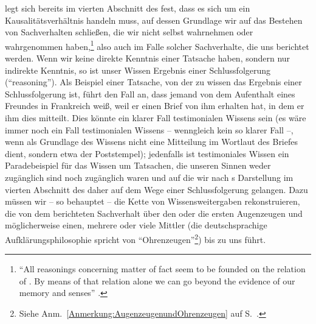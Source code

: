  legt sich bereits im vierten Abschnitt des  fest, dass es sich um ein Kausalitätsverhältnis
handeln muss, auf dessen Grundlage wir auf das Bestehen von Sachverhalten
schließen, die wir nicht selbst wahrnehmen oder wahrgenommen
haben,\footnote{\enquote{All reasonings concerning matter of fact seem to be
founded on the relation of . By means of that relation
alone we can go beyond the evidence of our memory and senses}
\parencite[][24]{Hume:AnEnquiryConcerningHumanUnderstanding1964}.} also auch im
Falle solcher Sachverhalte, die uns berichtet werden. Wenn wir keine direkte
Kenntnis einer Tatsache haben, sondern nur indirekte Kenntnis, so ist unser
Wissen Ergebnis einer Schlussfolgerung (\enquote{reasoning}). Als Beispiel einer
Tatsache, von der zu wissen das Ergebnis einer Schlussfolgerung ist, führt
 den Fall an, dass jemand von dem Aufenthalt eines Freundes in
Frankreich weiß, weil er einen Brief von ihm erhalten hat, in dem er ihm dies
mitteilt. Dies könnte ein klarer Fall testimonialen Wissens sein (es wäre immer
noch ein Fall testimonialen Wissens -- wenngleich kein so
klarer Fall --, wenn als Grundlage des Wissens nicht eine Mitteilung im Wortlaut
des Briefes dient, sondern etwa der Poststempel); jedenfalls ist testimoniales Wissen ein Paradebeispiel für das
Wissen um Tatsachen, die unseren Sinnen weder zugänglich sind noch zugänglich
waren und auf die wir nach s Darstellung im vierten Abschnitt
des  daher auf dem Wege einer Schlussfolgerung gelangen. Dazu
müssen wir -- so behauptet  -- die Kette von
Wissensweitergaben rekonstruieren, die von dem berichteten Sachverhalt über den
oder die ersten Augenzeugen und möglicherweise einen, mehrere oder viele Mittler
(die deutschsprachige Aufklärungsphilosophie spricht von
\enquote{Ohrenzeugen}\footnote{Siehe
Anm.~\ref{Anmerkung:AugenzeugenundOhrenzeugen} auf
S.~\pageref{Anmerkung:AugenzeugenundOhrenzeugen}.}) bis zu uns führt.


